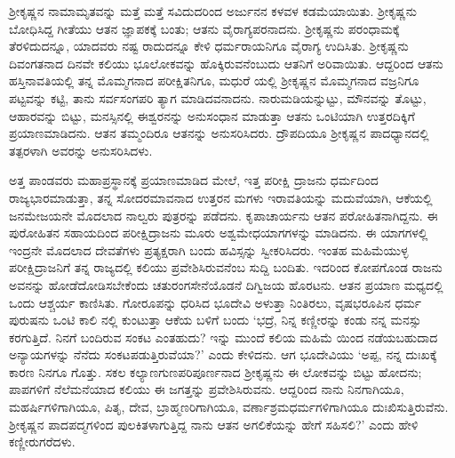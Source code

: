 ಶ್ರೀಕೃಷ್ಣನ ನಾಮಾಮೃತವನ್ನು ಮತ್ತೆ ಮತ್ತೆ ಸವಿದುದರಿಂದ ಅರ್ಜುನನ ಕಳವಳ ಕಡಮೆಯಾಯಿತು. ಶ್ರೀಕೃಷ್ಣನು ಬೋಧಿಸಿದ್ದ ಗೀತೆಯು ಆತನ ಜ್ಞಾಪಕಕ್ಕೆ ಬಂತು; ಆತನು ವೈರಾಗ್ಯಪರನಾದನು. ಶ್ರೀಕೃಷ್ಣನು ಪರಂಧಾಮಕ್ಕೆ ತೆರಳಿದುದನ್ನೂ, ಯಾದವರು ನಷ್ಟ ರಾದುದನ್ನೂ ಕೇಳಿ ಧರ್ಮರಾಯನಿಗೂ ವೈರಾಗ್ಯ ಉದಿಸಿತು. ಶ್ರೀಕೃಷ್ಣನು ದಿವಂಗತನಾದ ದಿನವೇ ಕಲಿಯು ಭೂಲೋಕವನ್ನು ಹೊಕ್ಕಿರುವನೆಂಬುದು ಆತನಿಗೆ ಅರಿವಾಯಿತು. ಆದ್ದರಿಂದ ಆತನು ಹಸ್ತಿನಾವತಿಯಲ್ಲಿ ತನ್ನ ಮೊಮ್ಮಗನಾದ ಪರೀಕ್ಷಿತನಿಗೂ, ಮಧುರೆ ಯಲ್ಲಿ ಶ್ರೀಕೃಷ್ಣನ ಮೊಮ್ಮಗನಾದ ವಜ್ರನಿಗೂ ಪಟ್ಟವನ್ನು ಕಟ್ಟಿ, ತಾನು ಸರ್ವಸಂಗಪರಿ ತ್ಯಾಗ ಮಾಡಿದವನಾದನು. ನಾರುಮಡಿಯನ್ನುಟ್ಟು, ಮೌನವನ್ನು ತೊಟ್ಟು, ಆಹಾರವನ್ನು ಬಿಟ್ಟು, ಮನಸ್ಸಿನಲ್ಲಿ ಈಶ್ವರನನ್ನು ಅನುಸಂಧಾನ ಮಾಡುತ್ತಾ ಆತನು ಒಂಟಿಯಾಗಿ ಉತ್ತರದಿಕ್ಕಿಗೆ ಪ್ರಯಾಣಮಾಡಿದನು. ಆತನ ತಮ್ಮಂದಿರೂ ಆತನನ್ನು ಅನುಸರಿಸಿದರು. ದ್ರೌಪದಿಯೂ ಶ್ರೀಕೃಷ್ಣನ ಪಾದಧ್ಯಾನದಲ್ಲಿ ತತ್ಪರಳಾಗಿ ಅವರನ್ನು ಅನುಸರಿಸಿದಳು.

ಅತ್ತ ಪಾಂಡವರು ಮಹಾಪ್ರಸ್ಥಾನಕ್ಕೆ ಪ್ರಯಾಣಮಾಡಿದ ಮೇಲೆ, ಇತ್ತ ಪರೀಕ್ಷಿ ದ್ರಾಜನು ಧರ್ಮದಿಂದ ರಾಜ್ಯಭಾರಮಾಡುತ್ತಾ, ತನ್ನ ಸೋದರಮಾವನಾದ ಉತ್ತರನ ಮಗಳು ಇರಾವತಿಯನ್ನು ಮದುವೆಯಾಗಿ, ಆಕೆಯಲ್ಲಿ ಜನಮೇಜಯನೇ ಮೊದಲಾದ ನಾಲ್ವರು ಪುತ್ರರನ್ನು ಪಡೆದನು. ಕೃಪಾಚಾರ್ಯನು ಆತನ ಪರೋಹಿತನಾಗಿದ್ದನು. ಈ ಪುರೋಹಿತನ ಸಹಾಯದಿಂದ ಪರೀಕ್ಷಿದ್ರಾಜನು ಮೂರು ಅಶ್ವಮೇಧಯಾಗಗಳನ್ನು ಮಾಡಿದನು. ಈ ಯಾಗಗಳಲ್ಲಿ ಇಂದ್ರನೇ ಮೊದಲಾದ ದೇವತೆಗಳು ಪ್ರತ್ಯಕ್ಷರಾಗಿ ಬಂದು ಹವಿಸ್ಸನ್ನು ಸ್ವೀಕರಿಸಿದರು. ಇಂತಹ ಮಹಿಮೆಯುಳ್ಳ ಪರೀಕ್ಷಿದ್ರಾಜನಿಗೆ ತನ್ನ ರಾಜ್ಯದಲ್ಲಿ ಕಲಿಯು ಪ್ರವೇಶಿಸಿರುವನೆಂಬ ಸುದ್ದಿ ಬಂದಿತು. ಇದರಿಂದ ಕೋಪಗೊಂಡ ರಾಜನು ಅವನನ್ನು ಹೋಡೆದೋಡಿಸಬೇಕೆಂದು ಚತುರಂಗಸೇನೆಯೊಡನೆ ದಿಗ್ವಿಜಯ ಹೊರಟನು. ಆತನ ಪ್ರಯಾಣ ಮಧ್ಯದಲ್ಲಿ ಒಂದು ಆಶ್ಚರ್ಯ ಕಾಣಿಸಿತು. ಗೋರೂಪನ್ನು ಧರಿಸಿದ ಭೂದೇವಿ ಅಳುತ್ತಾ ನಿಂತಿರಲು, ವೃಷಭರೂಪಿನ ಧರ್ಮ ಪುರುಷನು ಒಂಟಿ ಕಾಲಿ ನಲ್ಲಿ ಕುಂಟುತ್ತಾ ಆಕೆಯ ಬಳಿಗೆ ಬಂದು ‘ಭದ್ರೆ, ನಿನ್ನ ಕಣ್ಣೀರನ್ನು ಕಂಡು ನನ್ನ ಮನಸ್ಸು ಕರಗುತ್ತಿದೆ. ನಿನಗೆ ಬಂದಿರುವ ಸಂಕಟ ಎಂತಹುದು? ಇನ್ನು ಮುಂದೆ ಕಲಿಯ ಮಹಿಮೆ ಯಿಂದ ನಡೆಯಬಹುದಾದ ಅನ್ಯಾಯಗಳನ್ನು ನೆನೆದು ಸಂಕಟಪಡುತ್ತಿರುವೆಯಾ?’ ಎಂದು ಕೇಳಿದನು. ಆಗ ಭೂದೇವಿಯು ‘ಅಪ್ಪ, ನನ್ನ ದುಃಖಕ್ಕೆ ಕಾರಣ ನಿನಗೂ ಗೊತ್ತು. ಸಕಲ ಕಲ್ಯಾಣಗುಣಪರಿಪೂರ್ಣನಾದ ಶ್ರೀಕೃಷ್ಣನು ಈ ಲೋಕವನ್ನು ಬಿಟ್ಟು ಹೋದನು; ಪಾಪಗಳಿಗೆ ನೆಲೆಮನೆಯಾದ ಕಲಿಯು ಈ ಜಗತ್ತನ್ನು ಪ್ರವೇಶಿಸಿರುವನು. ಆದ್ದರಿಂದ ನಾನು ನಿನಗಾಗಿಯೂ, ಮಹರ್ಷಿಗಳಿಗಾಗಿಯೂ, ಪಿತೃ, ದೇವ, ಬ್ರಾಹ್ಮಣರಿಗಾಗಿಯೂ, ವರ್ಣಾಶ್ರಮಧರ್ಮಗಳಿಗಾಗಿಯೂ ದುಃಖಿಸುತ್ತಿರುವೆನು. ಶ್ರೀಕೃಷ್ಣನ ಪಾದಪದ್ಮಗಳಿಂದ ಪುಲಕಿತಳಾಗುತ್ತಿದ್ದ ನಾನು ಆತನ ಅಗಲಿಕೆಯನ್ನು ಹೇಗೆ ಸಹಿಸಲಿ?’ ಎಂದು ಹೇಳಿ ಕಣ್ಣೀರುಗರೆದಳು.


